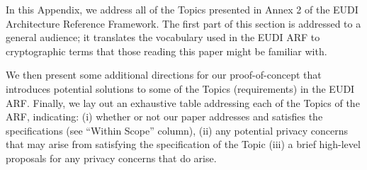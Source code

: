 In this Appendix, we address all of the Topics presented in Annex 2 of the EUDI Architecture Reference Framework. 
The first part of this section is addressed to a general audience; it translates the vocabulary used in the EUDI ARF to cryptographic terms that those reading this paper might be familiar with.

We then present some additional directions for our proof-of-concept that introduces potential solutions to some of the Topics (requirements) in the EUDI ARF.
Finally, we lay out an exhaustive table addressing each of the Topics of the ARF, indicating:
(i) whether or not our paper addresses and satisfies the specifications (see ``Within Scope'' column),
(ii) any potential privacy concerns that may arise from satisfying the specification of the Topic
(iii) a brief high-level proposals for any privacy concerns that do arise.

